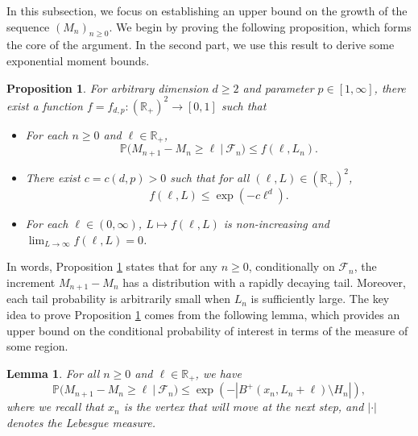 \documentclass[a4paper, 11pt]{article}
\theoremstyle{plain}
\newtheorem{Lemma}[Theorem]{Lemma}
\newtheorem{Proposition}[Theorem]{Proposition}
\theoremstyle{definition}
\newcommand{\R}{\mathbb{R}}
\renewcommand{\P}{\mathbb{P}}
\numberwithin{equation}{section}
\begin{document}
In this subsection, we focus on establishing an upper bound on the growth of the sequence $(M_n)_{n\geq0}$. We begin by proving the following proposition, which forms the core of the argument. In the second part, we use this result to derive some exponential moment bounds.


\begin{Proposition}
    \label{prop_upper_control}
    For arbitrary dimension $d\geq 2$ and parameter $p\in [1, \infty]$, there exist a function $f=f_{d, p}:(\R_+)^2\to[0, 1]$ such that 
        \begin{itemize}
            \item[(a)] For each $n\geq 0$ and $\ell\in\R_+$,
                \[\P\big(M_{n+1}-M_n\geq \ell~\vert~\mathcal F_n\big)\leq f(\ell, L_n).\]
            \item[(b)] There exist $c=c(d, p)>0$ such that for all $(\ell,L)\in(\R_+)^2$,
                \[f(\ell, L)\leq \exp(-c\ell^d).\]
            \item[(c)] For each $\ell\in(0,\infty)$, $L\mapsto f(\ell, L)$ is non-increasing and  $\lim_{L\to\infty}f(\ell, L)=0$.
        \end{itemize}
\end{Proposition}


In words, Proposition \ref{prop_upper_control} states that for any $n\geq0$, conditionally on $\mathcal F_n$, the increment $M_{n+1}-M_n$ has a distribution with a rapidly decaying tail. Moreover, each tail probability is arbitrarily small when $L_n$ is sufficiently large. The key idea to prove Proposition \ref{prop_upper_control} comes from the following lemma, which provides an upper bound on the conditional probability of interest in terms of the measure of some region.


\begin{Lemma}
    \label{lemma_proba_area}
    For all $n\geq0$ and $\ell\in\R_+$, we have
        \[\P\big(M_{n+1}-M_n\geq\ell~\vert~\mathcal F_n\big)\leq\exp{(-|B^+(x_n,L_n+\ell)\setminus H_n|)},\]
    where we recall that $x_n$ is the vertex that will move at the next step, and $|\cdot|$ denotes the Lebesgue measure.
\end{Lemma}
\end{document}
